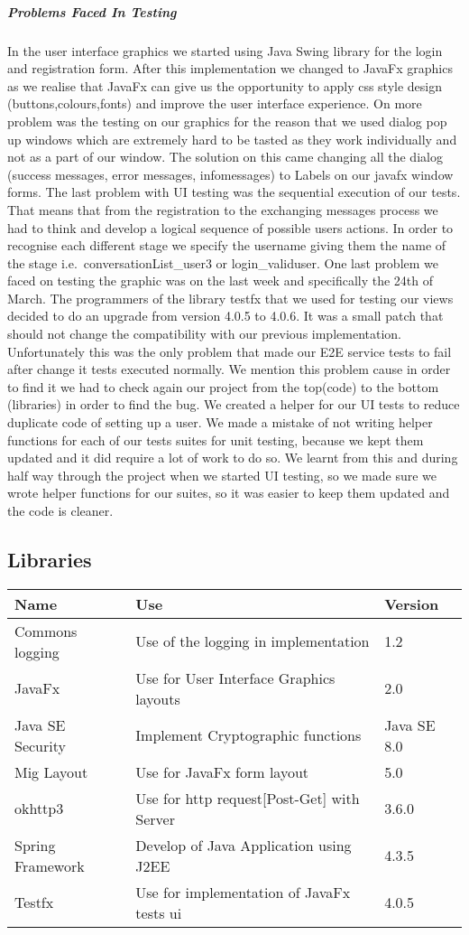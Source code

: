 \documentclass[11pt,a4paper]{report}
\begin{document}
\subparagraph{Problems Faced In Testing}
 In the user interface graphics we started using Java Swing library for the login and registration form. After this implementation we changed to JavaFx graphics as we realise that JavaFx can give us the opportunity to apply css style design (buttons,colours,fonts) and improve the user interface experience. On more problem was the testing on our graphics for the reason that we used dialog pop up windows which are extremely hard to be tasted as they work individually and not as a part of our window. The solution on this came changing all the dialog (success messages, error messages, infomessages) to Labels on our javafx window forms. The last problem with UI testing was the sequential execution of our tests. That means that from the registration to the exchanging messages process we had to think and develop a logical sequence of possible users actions. In order to recognise each different stage we specify the username giving them the name of the stage i.e.\ conversationList\_user3 or login\_validuser. One last problem we faced on testing the graphic was on the last week and specifically the 24th of March. The programmers of the library testfx that we used for testing our views decided to do an upgrade from version 4.0.5 to 4.0.6. It was a small patch that should not change the compatibility with our previous implementation. Unfortunately this was the only problem that made our E2E service tests to fail after change it tests executed normally. We mention this problem cause in order to find it we had to check again our project from the top(code) to the bottom (libraries) in order to find the bug. We created a helper for our UI tests to reduce duplicate code of setting up a user. We made a mistake of not writing helper functions for each of our tests suites for unit testing, because we kept them updated and it did require a lot of work to do so. We learnt from this and during half way through the project when we started UI testing, so we made sure we wrote helper functions for our suites, so it was easier to keep them updated and the code is cleaner.


\subsection{Libraries}

\begin{tabular}{| l | l | l |}
  \hline
  Name & Use & Version \\
  \hline
  Commons logging & Use of the logging in implementation & 1.2\\
  JavaFx & Use for User Interface Graphics layouts & 2.0\\
  Java SE Security & Implement Cryptographic functions & Java SE 8.0\\
  Mig Layout & Use for JavaFx form layout & 5.0\\
  okhttp3 & Use for http request[Post-Get] with Server  & 3.6.0\\
  Spring Framework & Develop of Java Application using J2EE & 4.3.5\\
  Testfx & Use for implementation of JavaFx tests ui  & 4.0.5\\
  \hline
\end{tabular}
\end{document}
